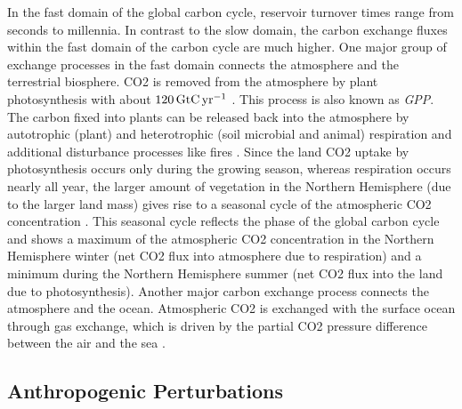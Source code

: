 In the fast domain of the global carbon cycle, reservoir turnover times range
from seconds to millennia. In contrast to the slow domain, the carbon exchange
fluxes within the fast domain of the carbon cycle are much higher. One major
group of exchange processes in the fast domain connects the atmosphere and the
terrestrial biosphere. \Ac{CO2} is removed from the atmosphere by plant
photosynthesis with about $120 \unit{\GtCyr{}}$ \autocite{Ciais2013}. This
process is also known as \emph{\ac{GPP}}. The carbon fixed into plants can be
released back into the atmosphere by autotrophic (plant) and heterotrophic
(soil microbial and animal) respiration and additional disturbance processes
like fires \autocite{Ciais2013}. Since the land \ac{CO2} uptake by
photosynthesis occurs only during the growing season, whereas respiration
occurs nearly all year, the larger amount of vegetation in the Northern
Hemisphere (due to the larger land mass) gives rise to a seasonal cycle of the
atmospheric \ac{CO2} concentration \autocite{Keeling1995}. This seasonal cycle
reflects the phase of the global carbon cycle and shows a maximum of the
atmospheric \ac{CO2} concentration in the Northern Hemisphere winter (net
\ac{CO2} flux into atmosphere due to respiration) and a minimum during the
Northern Hemisphere summer (net \ac{CO2} flux into the land due to
photosynthesis). Another major carbon exchange process connects the atmosphere
and the ocean. Atmospheric \ac{CO2} is exchanged with the surface ocean through
gas exchange, which is driven by the partial \ac{CO2} pressure difference
between the air and the sea \autocite{Ciais2013}.


\subsection{Anthropogenic Perturbations}
\label{subsec:02:carbon_cycle_perturbations}

